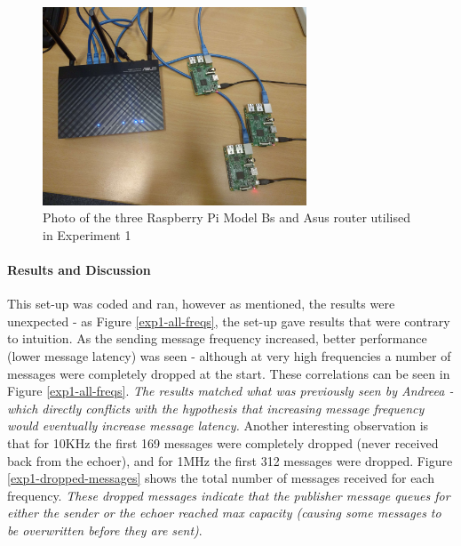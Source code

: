 \documentclass[../dissertation.tex]{subfiles}
\begin{document}
\begin{figure}[H]
\centering
\includegraphics[width=0.7\textwidth]{images/experiment1/bare-pis.jpg}
\caption{Photo of the three Raspberry Pi Model Bs and Asus router utilised in Experiment 1}
\end{figure}

\paragraph{Results and Discussion} This set-up was coded and ran, however as mentioned, the results were unexpected - as Figure \ref{exp1-all-freqs}, the set-up gave results that were contrary to intuition. As the sending message frequency increased, better performance (lower message latency) was seen - although at very high frequencies a number of messages were completely dropped at the start. These correlations can be seen in Figure \ref{exp1-all-freqs}. \textit{The results matched what was previously seen by Andreea - which directly conflicts with the hypothesis that increasing message frequency would eventually increase message latency.} Another interesting observation is that for 10KHz the first 169 messages were completely dropped (never received back from the echoer), and for 1MHz the first 312 messages were dropped. Figure \ref{exp1-dropped-messages} shows the total number of messages received for each frequency. \textit{These dropped messages indicate that the publisher message queues for either the sender or the echoer reached max capacity (causing some messages to be overwritten before they are sent)}.
\end{document}
